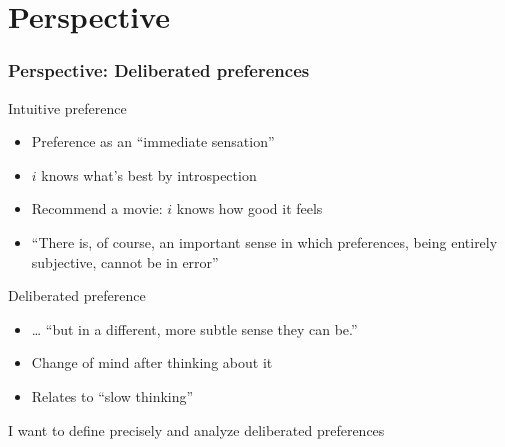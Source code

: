 \documentclass[french,english]{beamer}
\begin{document}
\section{Perspective}
\begin{frame}
	\frametitle{Perspective: Deliberated preferences}
	\begin{block}{Intuitive preference}
		\begin{itemize}
			\item Preference as an “immediate sensation” \citep{von_neumann_theory_1944}
			\item $i$ knows what’s best by introspection
			\item Recommend a movie: $i$ knows how good it feels
			\item “There is, of course, an important sense in which preferences, being entirely subjective, cannot be in error” \citep{savage_foundations_1972}
		\end{itemize}
	\end{block}
	\begin{block}{Deliberated preference}
		\begin{itemize}
			\item … “but in a different, more subtle sense they can be.”
			\item Change of mind after thinking about it
			\item Relates to “slow thinking” \citep{kahneman_thinking_2013}
		\end{itemize}
	\end{block}
	I want to define precisely and analyze deliberated preferences
\end{frame}
\end{document}
